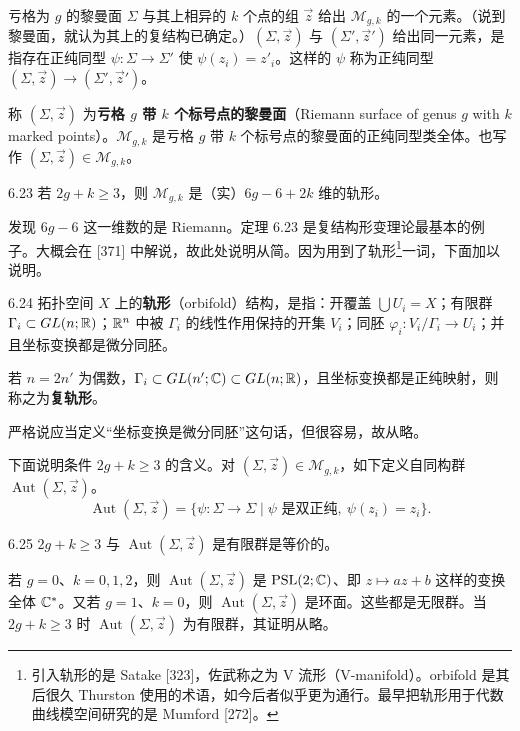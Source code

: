 亏格为 $g$ 的黎曼面 $\Sigma$ 与其上相异的 $k$ 个点的组 $\vec z$ 给出 $\mathcal{M}_{g,k}$ 的一个元素。（说到黎曼面，就认为其上的复结构已确定。）$(\Sigma,\vec z)$ 与 $(\Sigma',\vec z')$ 给出同一元素，是指存在正纯同型 $\psi\colon\Sigma\to\Sigma'$ 使 $\psi(z_i)=z'_i$。这样的 $\psi$ 称为正纯同型 $(\Sigma,\vec z)\to(\Sigma',\vec z')$。

称 $(\Sigma,\vec z)$ 为\textbf{亏格 $g$ 带 $k$ 个标号点的黎曼面}（Riemann surface of genus $g$ with $k$ marked points）。$\mathcal{M}_{g,k}$ 是亏格 $g$ 带 $k$ 个标号点的黎曼面的正纯同型类全体。也写作 $(\Sigma,\vec z)\in\mathcal{M}_{g,k}$。

\begin{theorem}{6.23}
  若 $2g+k\geq3$，则 $\mathcal{M}_{g,k}$ 是（实）$6g-6+2k$ 维的轨形。
\end{theorem}

发现 $6g-6$ 这一维数的是 Riemann。定理 6.23 是复结构形变理论最基本的例子。大概会在 [371] 中解说，故此处说明从简。因为用到了轨形\footnote{引入轨形的是 Satake [323]，佐武称之为 V 流形（V-manifold）。orbifold 是其后很久 Thurston 使用的术语，如今后者似乎更为通行。最早把轨形用于代数曲线模空间研究的是 Mumford [272]。}一词，下面加以说明。

\begin{definition}{6.24}
  拓扑空间 $X$ 上的\textbf{轨形}（orbifold）结构，是指：开覆盖 $\bigcup U_i=X$；有限群 $\Gamma_i\subset GL(n;\mathbb{R})$；$\mathbb{R}^n$ 中被 $\Gamma_i$ 的线性作用保持的开集 $V_i$；同胚 $\varphi_i\colon V_i/\Gamma_i\to U_i$；并且坐标变换都是微分同胚。

  若 $n=2n'$ 为偶数，$\Gamma_i\subset GL(n';\mathbb{C})\subset GL(n;\mathbb{R})$，且坐标变换都是正纯映射，则称之为\textbf{复轨形}。
\end{definition}

严格说应当定义“坐标变换是微分同胚”这句话，但很容易，故从略。

下面说明条件 $2g+k\geq3$ 的含义。对 $(\Sigma,\vec z)\in\mathcal{M}_{g,k}$，如下定义自同构群 $\operatorname{Aut}(\Sigma,\vec z)$。
\begin{equation}
  \operatorname{Aut}(\Sigma,\vec z)=\{\psi\colon\Sigma\to\Sigma\mid\psi\text{ 是双正纯},\ \psi(z_i)=z_i\}. \tag{6.8}
\end{equation}

\begin{lemma}{6.25}
  $2g+k\geq3$ 与 $\operatorname{Aut}(\Sigma,\vec z)$ 是有限群是等价的。
\end{lemma}

若 $g=0$、$k=0,1,2$，则 $\operatorname{Aut}(\Sigma,\vec z)$ 是 $\mathrm{PSL}(2;\mathbb{C})$、即 $z\mapsto az+b$ 这样的变换全体 $\mathbb{C}^*$。又若 $g=1$、$k=0$，则 $\operatorname{Aut}(\Sigma,\vec z)$ 是环面。这些都是无限群。当 $2g+k\geq3$ 时 $\operatorname{Aut}(\Sigma,\vec z)$ 为有限群，其证明从略。

